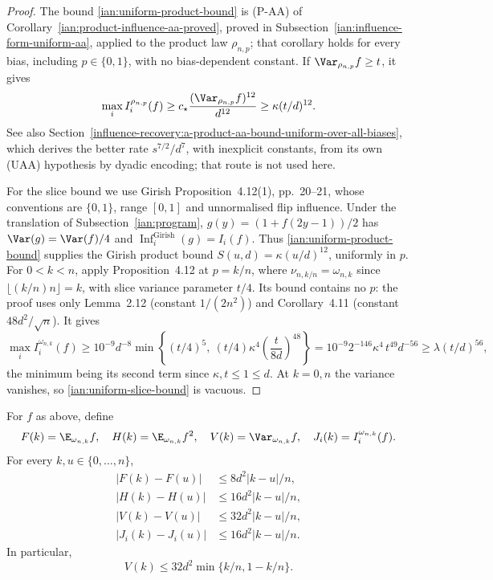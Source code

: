 \begin{proof}
The bound \eqref{ian:uniform-product-bound} is (P-AA) of
Corollary~\ref{ian:product-influence-aa-proved}, proved in
Subsection~\ref{ian:influence-form-uniform-aa}, applied to the product
law \(\rho_{n,p}\); that corollary holds for every bias, including
\(p\in\{0,1\}\), with no bias-dependent constant. If
\(\Var_{\rho_{n,p}}f\ge t\), it gives
\[
 \max_i I_i^{\rho_{n,p}}(f)
 \ge c_\star\frac{(\Var_{\rho_{n,p}}f)^{12}}{d^{12}}
 \ge\kappa(t/d)^{12}.
\]
See also
Section~\ref{influence-recovery:a-product-aa-bound-uniform-over-all-biases},
which derives the better rate \(s^{7/2}/d^7\), with inexplicit
constants, from its own (UAA) hypothesis by dyadic encoding; that
route is not used here.

For the slice bound we use Girish Proposition~4.12(1), pp.~20--21,
whose conventions are \(\{0,1\}\), range \([0,1]\) and unnormalised
flip influence. Under the translation of
Subsection~\ref{ian:program}, \(g(y)=(1+f(2y-1))/2\) has
\(\Var(g)=\Var(f)/4\) and
\(\operatorname{Inf}^{\mathrm{Girish}}_i(g)=I_i(f)\). Thus
\eqref{ian:uniform-product-bound} supplies the Girish product bound
\(S(u,d)=\kappa(u/d)^{12}\), uniformly in \(p\). For \(0<k<n\), apply
Proposition~4.12 at \(p=k/n\), where \(\nu_{n,k/n}=\omega_{n,k}\) since \(\lfloor(k/n)n\rfloor=k\), with
slice variance parameter \(t/4\). Its bound contains no \(p\): the proof
uses only Lemma~2.12 (constant \(1/(2n^2)\)) and Corollary~4.11
(constant \(48d^2/\sqrt n\)). It gives
\[
 \max_i I_i^{\omega_{n,k}}(f)
 \ge10^{-9}d^{-8}
 \min\left\{(t/4)^5,\
       (t/4)\kappa^4\left(\frac{t}{8d}\right)^{48}\right\}
 =10^{-9}2^{-146}\kappa^4\,t^{49}d^{-56}
 \ge\lambda(t/d)^{56},
\]
the minimum being its second term since \(\kappa,t\le1\le d\). At
\(k=0,n\) the variance vanishes, so \eqref{ian:uniform-slice-bound} is
vacuous.
\end{proof}

\begin{lemma}
\label{ian:slice-continuity}
For \(f\) as above, define
\[
 F(k)=\E_{\omega_{n,k}}f,\quad
 H(k)=\E_{\omega_{n,k}}f^2,\quad
 V(k)=\Var_{\omega_{n,k}}f,\quad
 J_i(k)=I_i^{\omega_{n,k}}(f).
\]
For every \(k,u\in\{0,\ldots,n\}\),
\[
 \begin{split}
 |F(k)-F(u)|&\le8d^2|k-u|/n,\\
 |H(k)-H(u)|&\le16d^2|k-u|/n,\\
 |V(k)-V(u)|&\le32d^2|k-u|/n,\\
 |J_i(k)-J_i(u)|&\le16d^2|k-u|/n.
 \end{split}
 \tag{10}\label{ian:slice-lipschitz-estimates}
\]
In particular,
\[
 V(k)\le32d^2\min\{k/n,1-k/n\}.
 \tag{11}\label{ian:endpoint-variance}
\]
\end{lemma}


